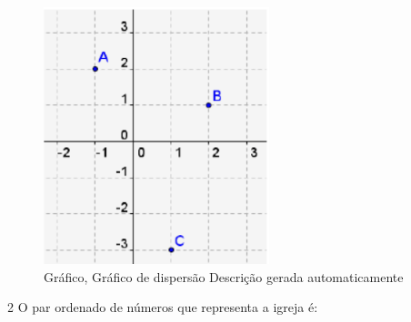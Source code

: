 \begin{escolha}
\begin{boxmedio}
\begin{boxmedio}
{\begin{boxpeq}
\begin{boxpeq}
{\begin{boxpeq}
\begin{boxmedio}
\begin{boxmedio}
\begin{boxpeq}
\begin{boxmedio}
\begin{boxpeq}
\begin{boxpeq}
\begin{boxpeq}
\begin{boxpeq}
\begin{boxmedio}
{\begin{boxmedio}
\begin{boxmedio}
\begin{boxpeq}
\begin{boxmedio}
\begin{boxpeq}
\begin{boxpeq}
\begin{boxpeq}
\begin{escolha}
{\begin{boxmedio}
\begin{boxpeq}
\begin{boxpeq}
\begin{boxpeq}
\begin{boxpeq}
\begin{boxpeq}
\begin{boxmedio}
\begin{boxpeq}
\begin{boxpeq}
\begin{boxpeq}
{\begin{boxpeq}
\begin{boxmedio}
\begin{boxpeq}
\begin{boxpeq}
\begin{boxpeq}
{\begin{boxpeq}
\begin{boxmedio}
{\begin{boxpeq}
\begin{boxpeq}
\begin{boxmedio}
\begin{boxmedio}
\begin{boxpeq}
\begin{boxpeq}
{\begin{boxpeq}
\begin{figure}
\centering
\includegraphics[width=2.58356in,height=2.95026in]{./_SAEB_9_MAT/media/image164.png}
\caption{Gráfico, Gráfico de dispersão Descrição gerada automaticamente}
\end{figure}


\begin{boxpeq}


\num{2} O par ordenado de números que representa a igreja é:


\end{boxpeq}
\end{boxpeq}}
\end{boxpeq}
\end{boxpeq}
\end{boxmedio}
\end{boxmedio}
\end{boxpeq}
\end{boxpeq}}
\end{boxmedio}
\end{boxpeq}}
\end{boxpeq}
\end{boxpeq}
\end{boxpeq}
\end{boxmedio}
\end{boxpeq}}
\end{boxpeq}
\end{boxpeq}
\end{boxpeq}
\end{boxmedio}
\end{boxpeq}
\end{boxpeq}
\end{boxpeq}
\end{boxpeq}
\end{boxpeq}
\end{boxmedio}}
\end{escolha}
\end{boxpeq}
\end{boxpeq}
\end{boxpeq}
\end{boxmedio}
\end{boxpeq}
\end{boxmedio}
\end{boxmedio}}
\end{boxmedio}
\end{boxpeq}
\end{boxpeq}
\end{boxpeq}
\end{boxpeq}
\end{boxmedio}
\end{boxpeq}
\end{boxmedio}
\end{boxmedio}
\end{boxpeq}}
\end{boxpeq}
\end{boxpeq}}
\end{boxmedio}
\end{boxmedio}
\end{escolha}
